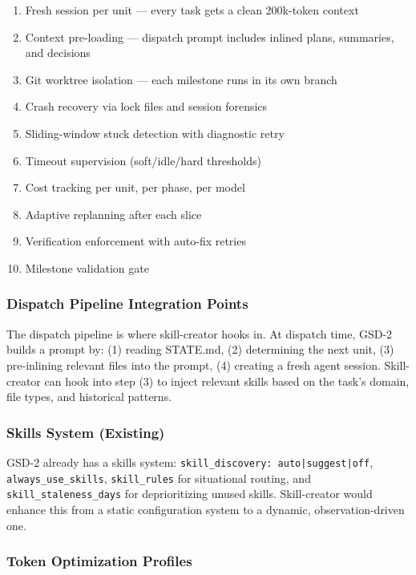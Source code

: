 \documentclass[11pt,letterpaper]{article}
\begin{document}
\begin{enumerate}[leftmargin=2em]
\item Fresh session per unit --- every task gets a clean 200k-token context
\item Context pre-loading --- dispatch prompt includes inlined plans, summaries, and decisions
\item Git worktree isolation --- each milestone runs in its own branch
\item Crash recovery via lock files and session forensics
\item Sliding-window stuck detection with diagnostic retry
\item Timeout supervision (soft/idle/hard thresholds)
\item Cost tracking per unit, per phase, per model
\item Adaptive replanning after each slice
\item Verification enforcement with auto-fix retries
\item Milestone validation gate
\end{enumerate}

\subsubsection{Dispatch Pipeline Integration Points}

The dispatch pipeline is where skill-creator hooks in. At dispatch time, GSD-2 builds a prompt by: (1) reading STATE.md, (2) determining the next unit, (3) pre-inlining relevant files into the prompt, (4) creating a fresh agent session. Skill-creator can hook into step (3) to inject relevant skills based on the task's domain, file types, and historical patterns.

\subsubsection{Skills System (Existing)}

GSD-2 already has a skills system: \texttt{skill\_discovery: auto|suggest|off}, \texttt{always\_use\_skills}, \texttt{skill\_rules} for situational routing, and \texttt{skill\_staleness\_days} for deprioritizing unused skills. Skill-creator would enhance this from a static configuration system to a dynamic, observation-driven one.

\subsubsection{Token Optimization Profiles}
\end{document}
